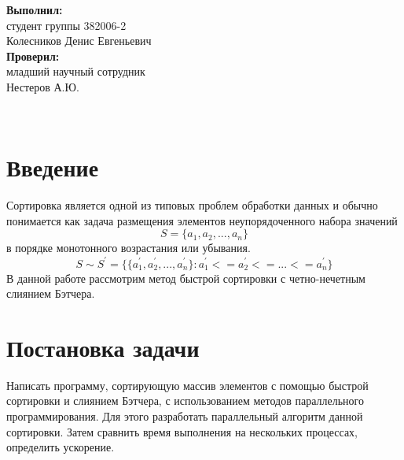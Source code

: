 \documentclass[oneside,final,14pt]{extreport}
\begin{document}
\begin{titlepage}
\vskip0.2cm
\vskip0.2cm
\vskip0.2cm
\Large
\vfill
{}
\vskip0.2cm
\normalsize
\vfill
\vfill
\begin{flushright}
\textbf{Выполнил:}\\
студент группы 382006-2\\
Колесников Денис Евгеньевич\\
\vspace{0.5cm}
\textbf{Проверил:}\\
младший научный сотрудник\\
Нестеров А.Ю.\\
\end{flushright}
\vfill
{}\\
\end{titlepage}


\tableofcontents

\chapter{Введение}
Сортировка является одной из типовых проблем обработки данных и обычно понимается как задача размещения элементов неупорядоченного набора значений 
\begin{displaymath}
    S =\{a_1,a_2,...,a_n\}
\end{displaymath}
в порядке монотонного возрастания или убывания. 
\begin{displaymath}
S \sim S^{'}=\{ \{a_{1}^{'},a_{2}^{'},...,a_{n}^{'}\}:a_{1}^{'}<=a_{2}^{'}<=...<=a_{n}^{'}\}
\end{displaymath}
В данной работе рассмотрим метод быстрой сортировки с четно-нечетным слиянием Бэтчера.
\chapter{Постановка задачи}
Написать программу, сортирующую массив элементов с помощью быстрой сортировки и слиянием Бэтчера, с использованием методов параллельного программирования. Для этого разработать параллельный алгоритм данной сортировки. Затем сравнить время выполнения на нескольких процессах, определить ускорение.
\end{document}
